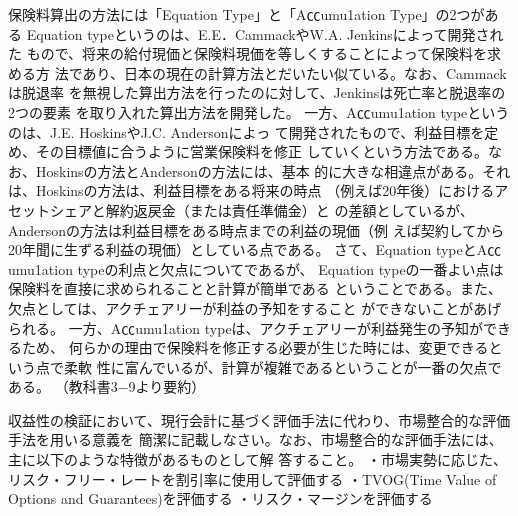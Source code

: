 \documentclass[report,gutter=10mm,fore-edge=10mm,uplatex,dvipdfmx]{jlreq}
\begin{document}
保険料算出の方法には「Equation Type」と「A㏄umu1ation Type」の2つがある
Equation typeというのは、E.E．CammackやW.A. Jenkinsによって開発された
もので、将来の給付現価と保険料現価を等しくすることによって保険料を求める方
法であり、日本の現在の計算方法とだいたい似ている。なお、Cammackは脱退率
を無視した算出方法を行ったのに対して、Jenkinsは死亡率と脱退率の2つの要素
を取り入れた算出方法を開発した。
一方、A㏄umu1ation typeというのは、J.E. HoskinsやJ.C. Andersonによっ
て開発されたもので、利益目標を定め、その目標値に合うように営業保険料を修正
していくという方法である。なお、Hoskinsの方法とAndersonの方法には、基本
的に大きな相違点がある。それは、Hoskinsの方法は、利益目標をある将来の時点
（例えば20年後）におけるアセットシェアと解約返戻金（または責任準備金）と
の差額としているが、Andersonの方法は利益目標をある時点までの利益の現価（例
えば契約してから20年聞に生ずる利益の現価）としている点である。
さて、Equation typeとA㏄umu1ation typeの利点と欠点についてであるが、
Equation typeの一番よい点は保険料を直接に求められることと計算が簡単である
ということである。また、欠点としては、アクチェアリーが利益の予知をすること
ができないことがあげられる。
一方、A㏄umu1ation typeは、アクチェアリーが利益発生の予知ができるため、
何らかの理由で保険料を修正する必要が生じた時には、変更できるという点で柔軟
性に富んでいるが、計算が複雑であるということが一番の欠点である。
（教科書3−9より要約）

収益性の検証において、現行会計に基づく評価手法に代わり、市場整合的な評価手法を用いる意義を
簡潔に記載しなさい。なお、市場整合的な評価手法には、主に以下のような特徴があるものとして解
答すること。
・市場実勢に応じた、リスク・フリー・レートを割引率に使用して評価する
・TVOG(Time Value of Options and Guarantees)を評価する
・リスク・マージンを評価する
\end{document}
